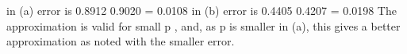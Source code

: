 \documentclass[a4paper,12pt]{article}
\begin{document}
in (a) error is 0.8912 0.9020 = 0.0108
in (b) error is 0.4405 0.4207 = 0.0198
The approximation is valid for small p , and, as p is smaller in (a), this gives a better approximation as noted with the smaller error.
\end{document}
